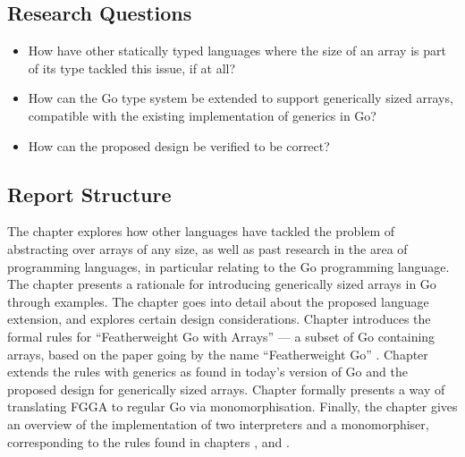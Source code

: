\subsection{Research Questions}

\begin{itemize}
      \item How have other statically typed languages where the size of an array
            is part of its type tackled this issue, if at all?
      \item How can the Go type system be extended to support generically sized
            arrays, compatible with the existing implementation of generics in
            Go?
      \item How can the proposed design be verified to be correct?
\end{itemize}


\subsection{Report Structure}

The  chapter explores how
other languages have tackled the problem of abstracting over arrays of any size,
as well as past research in the area of programming languages, in particular
relating to the Go programming language. The
 chapter presents a rationale for
introducing generically sized arrays in Go through examples. The
 chapter goes into detail about the
proposed language extension, and explores certain design considerations. Chapter
 introduces the formal rules for ``Featherweight
Go with Arrays'' --- a subset of Go containing arrays, based on the paper going
by the name ``Featherweight Go'' \autocite{fg}. Chapter
 extends the rules with generics as found in
today's version of Go and the proposed design for generically sized arrays.
Chapter  formally presents a way of
translating FGGA to regular Go via monomorphisation. Finally, the
 chapter gives an overview of
the implementation of two interpreters and a monomorphiser, corresponding
to the rules found in chapters ,
 and .
